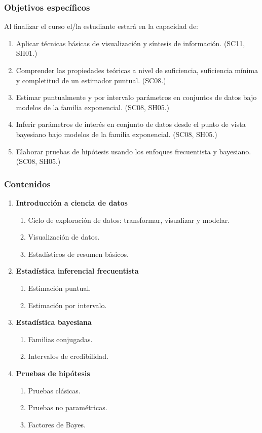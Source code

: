 \begin{refsection}
\subsubsection*{Objetivos específicos}

Al finalizar el curso el/la estudiante estará en la capacidad de:

\begin{enumerate}
\item Aplicar técnicas básicas de visualización y síntesis de información. (SC11, SH01.)
\item Comprender las propiedades teóricas a nivel de suficiencia, suficiencia mínima y completitud de un estimador puntual. (SC08.)
\item Estimar puntualmente y por intervalo parámetros en conjuntos de datos bajo modelos de la familia exponencial. (SC08, SH05.)
\item Inferir parámetros de interés en conjunto de datos desde el punto de vista bayesiano bajo modelos de la familia exponencial. (SC08, SH05.)
\item Elaborar pruebas de hipótesis usando los enfoques frecuentista y bayesiano. (SC08, SH05.)
\end{enumerate}

\subsubsection*{Contenidos}

\begin{enumerate}
\item \textbf{Introducción a ciencia de datos}
\begin{enumerate}
\item Ciclo de exploración de datos: transformar, visualizar y modelar.
\item Visualización de datos.
\item Estadísticos de resumen básicos.
\end{enumerate}
\item \textbf{Estadística inferencial frecuentista}
\begin{enumerate}
\item Estimación puntual.
\item Estimación por intervalo.
\end{enumerate}
\item \textbf{Estadística bayesiana}
\begin{enumerate}
\item Familias conjugadas.
\item Intervalos de credibilidad.
\end{enumerate}
\item \textbf{Pruebas de hipótesis}
\begin{enumerate}
\item Pruebas clásicas.
\item Pruebas no paramétricas.
\item Factores de Bayes.
\end{enumerate}
\end{enumerate}


\end{refsection}
